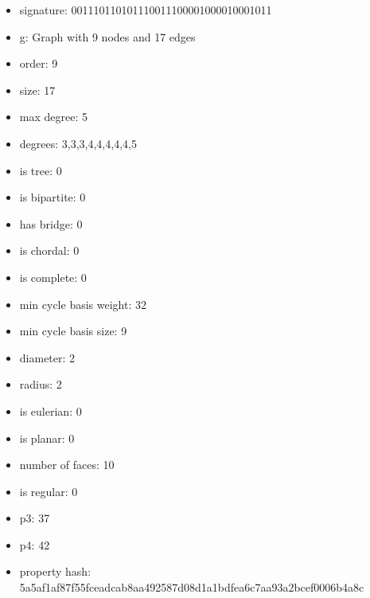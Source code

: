 \newpage
\begin{figure}
\end{figure}
\begin{itemize}
\item signature: 001110110101110011100001000010001011
\item g: Graph with 9 nodes and 17 edges
\item order: 9
\item size: 17
\item max degree: 5
\item degrees: 3,3,3,4,4,4,4,4,5
\item is tree: 0
\item is bipartite: 0
\item has bridge: 0
\item is chordal: 0
\item is complete: 0
\item min cycle basis weight: 32
\item min cycle basis size: 9
\item diameter: 2
\item radius: 2
\item is eulerian: 0
\item is planar: 0
\item number of faces: 10
\item is regular: 0
\item p3: 37
\item p4: 42
\item property hash: 5a5af1af87f55fceadcab8aa492587d08d1a1bdfea6c7aa93a2bcef0006b4a8c
\end{itemize}
